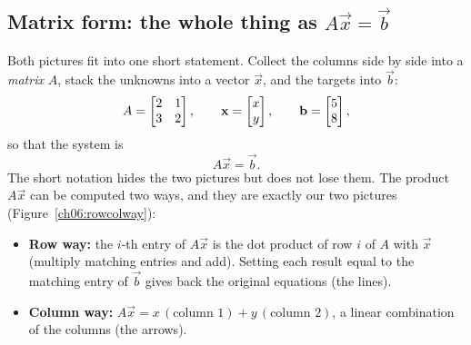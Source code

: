 \subsection{Matrix form: the whole thing as $A\vec x = \vec b$}

Both pictures fit into one short statement. Collect the columns
side by side into a \emph{matrix} $A$, stack the unknowns into a vector
$\vec x$, and the targets into $\vec b$:
\[
  A=\begin{bmatrix}2 & 1\\3 & 2\end{bmatrix},\qquad
  \mathbf{x}=\begin{bmatrix}x\\y\end{bmatrix},\qquad
  \mathbf{b}=\begin{bmatrix}5\\8\end{bmatrix},
\]
so that the system is
\[
  A\vec x = \vec b.
\]
The short notation hides the two pictures but does not lose them. The
product $A\vec x$ can be computed two ways, and they are exactly our two
pictures (Figure~\ref{ch06:rowcolway}):
\begin{itemize}
  \item \textbf{Row way:} the $i$-th entry of $A\vec x$ is the dot product
  of row $i$ of $A$ with $\vec x$ (multiply matching entries and add).
  Setting each result equal to the matching entry of $\vec b$ gives back the
  original equations (the lines).
  \item \textbf{Column way:} $A\vec x = x\,(\text{column }1) +
  y\,(\text{column }2)$, a linear combination of the columns (the arrows).
\end{itemize}

